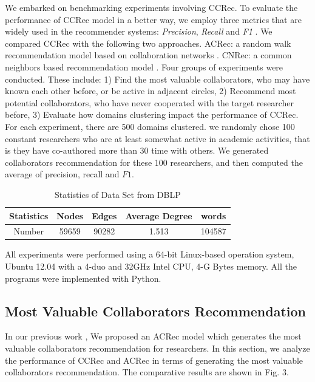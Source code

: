 \documentclass[review]{elsarticle}
\begin{document}
We embarked on benchmarking experiments involving CCRec. To evaluate the performance of CCRec model in a better way, we employ three metrics that are widely used in the recommender systems: \emph{Precision}, \emph{Recall} and \emph{F1} \cite{shani2011evaluating}. We compared CCRec with the following two approaches. ACRec: a random walk recommendation model based on collaboration networks \cite{li2014acrec}. CNRec: a common neighbors based recommendation model \cite{lopes2010collaboration}. Four groups of experiments were conducted. These include: 1) Find the most valuable collaborators, who may have known each other before, or be active in adjacent circles, 2) Recommend most potential collaborators, who have never cooperated with the target researcher before, 3) Evaluate how domains clustering impact the performance of CCRec. For each experiment, there are 500 domains clustered. we randomly chose 100 constant researchers who are at least somewhat active in academic activities, that is they have co-authored more than 30 time with others. We generated collaborators recommendation for these 100 researchers, and then computed the average of precision, recall and $F1$.

\begin{table}
\renewcommand{\arraystretch}{1.2}
\centering
\caption{Statistics of Data Set from DBLP}
\begin{tabular}{|c|c|c|c|c|} \hline
Statistics &Nodes&Edges&Average Degree&words\\ \hline
Number & 59659 &90282 &1.513 &104587\\
\hline\end{tabular}
\end{table}

All experiments were performed using a 64-bit Linux-based operation system, Ubuntu 12.04 with a 4-duo and 32GHz Intel CPU, 4-G Bytes memory. All the programs were implemented with Python.

\subsection{Most Valuable Collaborators Recommendation}
In our previous work \cite{li2014acrec}, We proposed an ACRec model which generates the most valuable collaborators recommendation for researchers. In this section, we analyze the performance of CCRec and ACRec in terms of generating the most valuable collaborators recommendation. The comparative results are shown in Fig. 3.
\end{document}
